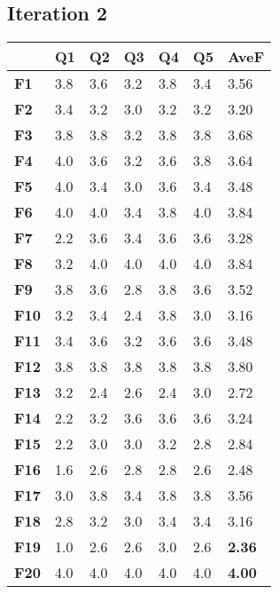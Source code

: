 		\subsection{Iteration 2}

			\begin{table}[!htpb]
			  \centering
			   \label{tab:results-features-it2}
			  \begin{tabular}{|R{1.5cm}|R{1cm}|R{1cm}|R{1cm}|R{1cm}|R{1cm}|R{1.5cm}|}
			  	\hline
			  	& \textbf{Q1} & \textbf{Q2} & \textbf{Q3} & \textbf{Q4} & \textbf{Q5} & \textbf{AveF} \\ \hline
			    \textbf{F1} & 3.8 		& 3.6 	& 3.2 	& 3.8 	& 3.4 	&  3.56 \\ \hline
			    \textbf{F2} & 3.4 		& 3.2 	& 3.0 	& 3.2 	& 3.2 	&  3.20 \\ \hline
			    \textbf{F3} & 3.8 		& 3.8 	& 3.2 	& 3.8 	& 3.8 	&  3.68 \\ \hline
			    \textbf{F4} & 4.0 		& 3.6 	& 3.2 	& 3.6 	& 3.8 	&  3.64 \\ \hline
			    \textbf{F5} & 4.0 		& 3.4 	& 3.0 	& 3.6 	& 3.4 	&  3.48 \\ \hline
			    \textbf{F6} & 4.0 		& 4.0 	& 3.4 	& 3.8 	& 4.0 	&  3.84 \\ \hline
			    \textbf{F7} & 2.2 		& 3.6 	& 3.4 	& 3.6 	& 3.6 	&  3.28 \\ \hline
			    \textbf{F8} & 3.2 		& 4.0 	& 4.0 	& 4.0 	& 4.0 	&  3.84 \\ \hline
			    \textbf{F9} & 3.8 		& 3.6 	& 2.8 	& 3.8 	& 3.6 	& 3.52 \\ \hline
			    \textbf{F10} & 3.2 		& 3.4 	& 2.4 	& 3.8 	& 3.0 	& 3.16 \\ \hline
			    \textbf{F11} & 3.4 		& 3.6 	& 3.2 	& 3.6 	& 3.6 	& 3.48 \\ \hline
			    \textbf{F12} & 3.8 		& 3.8 	& 3.8 	& 3.8 	& 3.8 	& 3.80 \\ \hline
			    \textbf{F13} & 3.2 		& 2.4 	& 2.6 	& 2.4 	& 3.0 	& 2.72 \\ \hline
			    \textbf{F14} & 2.2 		& 3.2 	& 3.6 	& 3.6 	& 3.6 	& 3.24 \\ \hline
			    \textbf{F15} & 2.2 		& 3.0 	& 3.0 	& 3.2 	& 2.8 	& 2.84 \\ \hline
			    \textbf{F16} & 1.6 		& 2.6 	& 2.8 	& 2.8 	& 2.6 	& 2.48 \\ \hline
			    \textbf{F17} & 3.0 		& 3.8 	& 3.4 	& 3.8 	& 3.8 	& 3.56 \\ \hline
			    \textbf{F18} & 2.8 		& 3.2 	& 3.0 	& 3.4 	& 3.4 	& 3.16 \\ \hline
			    \textbf{F19} & 1.0 		& 2.6 	& 2.6 	& 3.0 	& 2.6 	& \textbf{2.36} \\ \hline
			    \textbf{F20} & 4.0 		& 4.0 	& 4.0 	& 4.0 	& 4.0 	& \textbf{4.00} \\ \hline
			    

\end{tabular}
\end{table}
